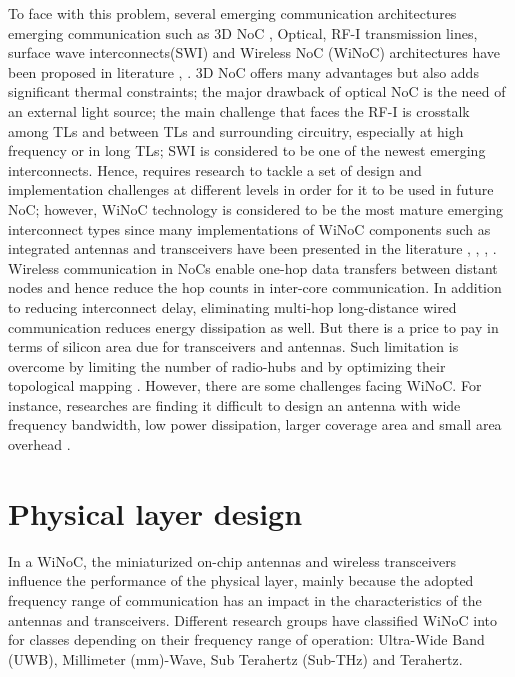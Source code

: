 \documentclass[12pt]{article}
\begin{document}
To face with this problem, several emerging communication architectures emerging communication such as 3D NoC \citep{6513612}, Optical, RF-I transmission lines, surface wave interconnects(SWI) and Wireless NoC (WiNoC) architectures have been proposed in literature  \citep{5071456}, \citep{7404347}. 3D NoC offers many advantages but also adds significant thermal constraints; the major drawback of optical NoC is the need of an external light source; the main challenge that faces the RF-I is crosstalk among TLs and between TLs and surrounding circuitry, especially at high frequency or in long TLs; SWI is considered to be one of the newest emerging interconnects. Hence, requires research to tackle a set of design and implementation challenges at different levels in order for it to be used in future NoC; however, WiNoC technology is considered to be the most mature emerging interconnect types since many implementations of WiNoC components such as integrated antennas and transceivers have been presented in the literature \citep{1459088}, \citep{5296159}, \citep{6569587}, \citep{7459514}. Wireless communication in NoCs enable one-hop data transfers between distant nodes and hence reduce the hop counts in inter-core communication. In addition to reducing interconnect delay, eliminating multi-hop long-distance wired communication reduces energy dissipation as well. But there is a price to pay in terms of silicon area due for transceivers and antennas. Such limitation is overcome by limiting the number of radio-hubs and by optimizing their topological mapping \citep{6302124}. However, there are some challenges facing WiNoC. For instance, researches are finding it difficult to design an antenna with wide frequency bandwidth, low power dissipation, larger coverage area and small area overhead \citep{6197727}.





\section{Physical layer design}

In a WiNoC, the miniaturized on-chip antennas and wireless transceivers influence the performance of the physical layer, mainly because the adopted frequency range of communication has an impact in the characteristics of the antennas and transceivers. Different research groups have classified WiNoC into for classes depending on their frequency range of operation: Ultra-Wide Band (UWB), Millimeter (mm)-Wave, Sub Terahertz (Sub-THz) and Terahertz. 
\end{document}
